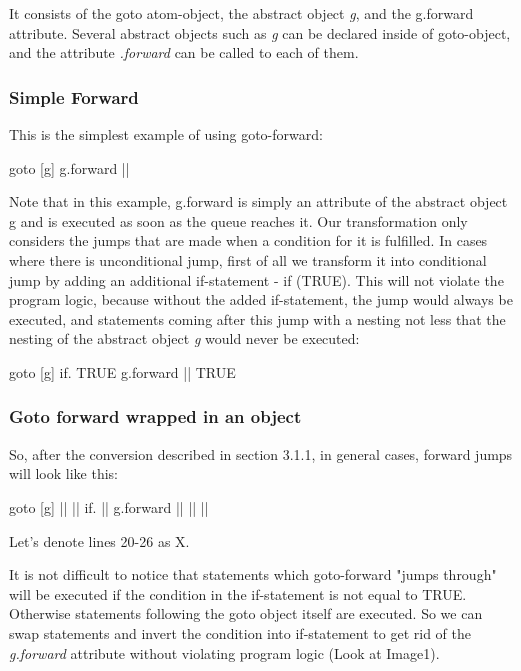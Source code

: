 \documentclass[sigplan,review,11pt,nonacm,natbib=false]{acmart}
\begin{document}
It consists of the goto atom-object, the abstract object \emph{g}, and the g.forward attribute. Several abstract objects such as \emph{g} can be declared inside of goto-object, and the attribute \emph{.forward} can be called to each of them.

\subsubsection{Simple Forward}
This is the simplest example of using goto-forward:

\begin{ffcode}
goto
  [g]
    g.forward ||
\end{ffcode}

Note that in this example, g.forward is simply an attribute of the abstract object g and is executed as soon as the queue reaches it.
Our transformation only considers the jumps that are made when a condition for it is fulfilled. In cases where there is unconditional jump, first of all we transform it into conditional jump by adding an additional if-statement - if (TRUE).
This will not violate the program logic, because without the added if-statement, the jump would always be executed, and statements coming after this jump with a nesting not less that the nesting of the abstract object \emph{g} would never be executed:

\begin{ffcode}
goto
  [g]
    if.
      TRUE
      g.forward ||
      TRUE
\end{ffcode}

\subsubsection{Goto forward wrapped in an object}
So, after the conversion described in section 3.1.1, in general cases, forward jumps will look like this:
\begin{ffcode}
goto
  [g]
    ||
      ||
      if.
        ||
        g.forward ||
        ||
      ||
\end{ffcode}

Let's denote lines 20-26 as X.

It is not difficult to notice that statements which goto-forward "jumps through" will be executed if the condition in the if-statement is not equal to TRUE.
Otherwise statements following the goto object itself are executed.
So we can swap statements and invert the condition into if-statement to get rid of the \emph{g.forward} attribute without violating program logic (Look at Image1).
\end{document}
